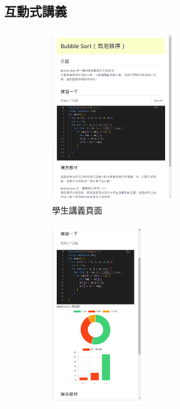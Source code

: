 
\subsection{互動式講義}

\begin{figure}[H]
  \begin{subfigure}{0.5\linewidth}
    \centering
    \includegraphics[width=0.6\textwidth]{images/side-s.png}
    \caption{學生講義頁面}
    \label{fig:student}
  \end{subfigure}
  \begin{subfigure}{0.5\linewidth}
    \centering
    \includegraphics[width=0.45\textwidth]{images/side-t.png}

\end{subfigure}
\end{figure}
